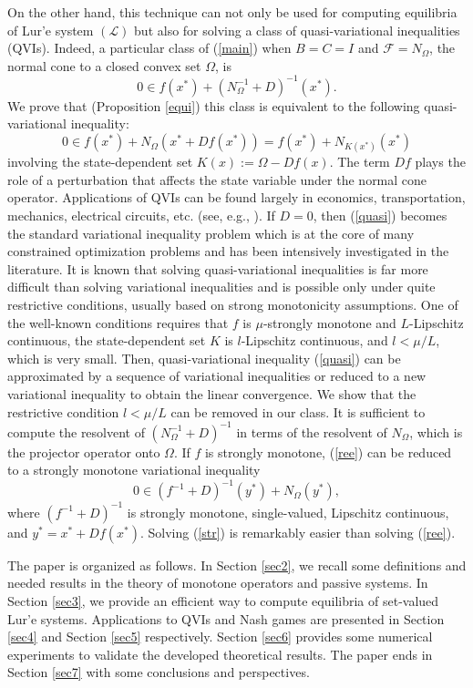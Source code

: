 \documentclass[11pt]{article}
\def\beq{\begin{equation}}
\def\eeq{\end{equation}}
\theoremstyle{plain}
\begin{document}
 On the other hand, this technique can not only be used for computing equilibria of Lur'e system $({\mathcal L})$  but also  for solving a class of  {{quasi-variational inequalities}} (QVIs).  Indeed, a particular class of (\ref{main}) when $B=C=I$ and $\mathcal{F}=N_{\Omega}$, the normal cone to a closed convex set $\Omega$, is 
 \beq\label{ree}
 0 \in f(x^*)+(N_\Omega^{-1}+D)^{-1}(x^*).
 \eeq
 We prove that (Proposition \ref{equi}) this class is equivalent to the following quasi-variational inequality: 
  \beq\label{quasi}
 0 \in   f(x^*)+N_\Omega(x^*+Df(x^*))= f(x^*)+N_{K(x^*)}(x^*)
\eeq 
{{involving}} the state-dependent set $K(x):=\Omega-Df(x)$. The term $Df$  plays the role of a perturbation that affects  the state variable under the normal cone operator.
 Applications of QVIs can be found largely in economics, transportation, mechanics, electrical circuits, etc. (see, e.g., \cite{Anh,Bensoussan,Bliemer,Kravchuk,Pang}). If $D=0$, then (\ref{quasi}) becomes the standard variational {{inequality}} problem 
 which is at the core of many constrained optimization problems  and has been intensively investigated in the literature.  It is known that solving quasi-variational inequalities  is far  more difficult than solving variational inequalities  and  {{is possible only}} under quite restrictive conditions, usually based on {{strong monotonicity assumptions}}.  One of the well-known conditions \cite{al1,Nesterov} requires that $f$ is $\mu$-strongly monotone and $L$-Lipschitz continuous, the state-dependent set $K$ is  $l$-Lipschitz continuous, and $l<\mu/L$, which is very small. Then,   quasi-variational inequality (\ref{quasi}) can be  approximated by a sequence of variational inequalities   \cite{Nesterov} or  reduced to a new variational inequality  \cite{al1} to obtain the linear convergence. 
 We show that the  restrictive condition $l<\mu/L$ can be removed in our   class.  It is sufficient to compute the  resolvent of  $(N_\Omega^{-1}+D)^{-1}$ in terms of the resolvent  of $N_\Omega$, which is  the projector operator onto $\Omega$.  If $f$ is strongly monotone,
(\ref{ree}) can be reduced  to a {{strongly monotone}} variational inequality 
  \beq\label{str}
0\in (f^{-1}+D)^{-1}(y^*)+N_\Omega(y^*),
\eeq
where $(f^{-1}+D)^{-1}$ is strongly monotone, single-valued, Lipschitz continuous, and $y^*=x^*+Df(x^*)$.  Solving (\ref{str}) is remarkably easier than solving (\ref{ree}).

The paper is organized as follows.  In Section \ref{sec2}, we recall some definitions and needed results in the theory of monotone operators and passive systems. In Section \ref{sec3},  we provide an efficient way to compute equilibria of set-valued Lur'e systems.  Applications to QVIs and Nash games  are presented in  Section \ref{sec4} and Section \ref{sec5} respectively. Section \ref{sec6} provides some numerical experiments to validate the developed theoretical results.  The paper  ends in Section \ref{sec7} with some conclusions and perspectives.
\end{document}
